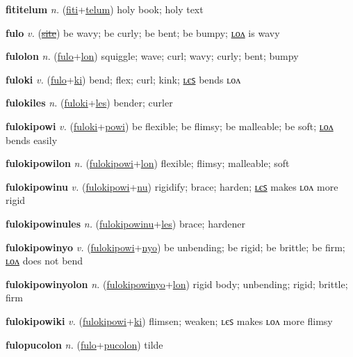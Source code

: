 \textbf{\hypertarget{fititelum}{fititelum}} \textit{n.} (\hyperlink{fiti}{fiti}+\allowbreak \hyperlink{telum}{telum})
holy book; holy text

\textbf{\hypertarget{fulo}{fulo}} \textit{v.} (\hyperlink{site}{\sout{site}})
be wavy; be curly; be bent; be bumpy; \hyperlink{fulolon}{ʟᴏᴧ} is wavy

\textbf{\hypertarget{fulolon}{fulolon}} \textit{n.} (\hyperlink{fulo}{fulo}+\allowbreak \hyperlink{lon}{lon})
squiggle; wave; curl; wavy; curly; bent; bumpy

\textbf{\hypertarget{fuloki}{fuloki}} \textit{v.} (\hyperlink{fulo}{fulo}+\allowbreak \hyperlink{ki}{ki})
bend; flex; curl; kink; \hyperlink{fulokiles}{ʟєꜱ} bends ʟᴏᴧ

\textbf{\hypertarget{fulokiles}{fulokiles}} \textit{n.} (\hyperlink{fuloki}{fuloki}+\allowbreak \hyperlink{les}{les})
bender; curler

\textbf{\hypertarget{fulokipowi}{fulokipowi}} \textit{v.} (\hyperlink{fuloki}{fuloki}+\allowbreak \hyperlink{powi}{powi})
be flexible; be flimsy; be malleable; be soft; \hyperlink{fulokipowilon}{ʟᴏᴧ} bends easily

\textbf{\hypertarget{fulokipowilon}{fulokipowilon}} \textit{n.} (\hyperlink{fulokipowi}{fulokipowi}+\allowbreak \hyperlink{lon}{lon})
flexible; flimsy; malleable; soft

\textbf{\hypertarget{fulokipowinu}{fulokipowinu}} \textit{v.} (\hyperlink{fulokipowi}{fulokipowi}+\allowbreak \hyperlink{nu}{nu})
rigidify; brace; harden; \hyperlink{fulokipowinules}{ʟєꜱ} makes ʟᴏᴧ more rigid

\textbf{\hypertarget{fulokipowinules}{fulokipowinules}} \textit{n.} (\hyperlink{fulokipowinu}{fulokipowinu}+\allowbreak \hyperlink{les}{les})
brace; hardener

\textbf{\hypertarget{fulokipowinyo}{fulokipowinyo}} \textit{v.} (\hyperlink{fulokipowi}{fulokipowi}+\allowbreak \hyperlink{nyo}{nyo})
be unbending; be rigid; be brittle; be firm; \hyperlink{fulokipowinyolon}{ʟᴏᴧ} does not bend

\textbf{\hypertarget{fulokipowinyolon}{fulokipowinyolon}} \textit{n.} (\hyperlink{fulokipowinyo}{fulokipowinyo}+\allowbreak \hyperlink{lon}{lon})
rigid body; unbending; rigid; brittle; firm

\textbf{\hypertarget{fulokipowiki}{fulokipowiki}} \textit{v.} (\hyperlink{fulokipowi}{fulokipowi}+\allowbreak \hyperlink{ki}{ki})
flimsen; weaken; ʟєꜱ makes ʟᴏᴧ more flimsy

\textbf{\hypertarget{fulopucolon}{fulopucolon}} \textit{n.} (\hyperlink{fulo}{fulo}+\allowbreak \hyperlink{pucolon}{pucolon})
tilde


